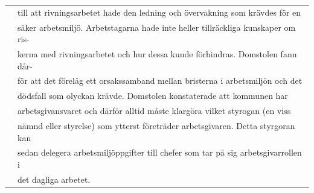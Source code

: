 \begin{tabular}{ll}
& till att rivningsarbetet hade den ledning och övervakning som krävdes för en \\
& säker arbetsmiljö. Arbetstagarna hade inte heller tillräckliga kunskaper om ris- \\
& kerna med rivningsarbetet och hur dessa kunde förhindras. Domstolen fann dår- \\
& för att det förelåg ett orsakssamband mellan bristerna i arbetsmiljön och det \\
& dödsfall som olyckan krävde. Domstolen konstaterade att kommunen har \\
& arbetsgivansvaret och därför alltid måste klargöra vilket styrogan (en viss \\
& nämnd eller styrelse) som ytterst företräder arbetsgivaren. Detta styrgoran kan \\
& sedan delegera arbetsmiljöppgifter till chefer som tar på sig arbetsgivarrollen i \\
& det dagliga arbetet.
\end{tabular}


